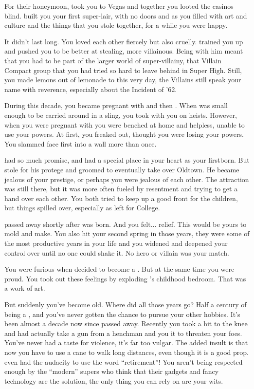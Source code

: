 \documentclass[char]{LRSguildcamp1}
\begin{document}
For their honeymoon, \cGS{\they} took you to Vegas and together you looted the casinos blind. \cGS{\They} built you your first super-lair, with no doors and as you filled with art and culture and the things that you stole together, for a while you were happy. 

It didn't last long. You loved each other fiercely but also cruelly. \cGS{} trained you up and pushed you to be better at stealing, more villainous. Being with him meant that you had to be part of the larger world of super-villainy, that Villain Compact group that you had tried so hard to leave behind in Super High. Still, you made lemons out of lemonade to this very day, the Villains still speak your name with reverence, especially about the Incident of '62. 

During this decade, you became pregnant with \cOldest{} and then \cArchitect{}. When \cOldest{} was small enough to be carried around in a sling, you took \cOldest{\them} with you on heists. However, when you were pregnant with \cArchitect{} you were benched at home and helpless, unable to use your powers.  At first, you freaked out, thought you were losing your powers. You slammed face first into a wall more than once.

\cOldest{} had so much promise, and had a special place in your heart as your firstborn. But \cGS{} stole \cOldest{} for his protege and groomed \cOldest{\them} to eventually take over Oldtown. He became jealous of your prestige, or perhaps you were jealous of each other. The attraction was still there, but it was more often fueled by resentment and trying to get a hand over each other.  You both tried to keep up a good front for the children, but things spilled over, especially as \cOldest{} left for College. 

\cGS{} passed away shortly after \cYoungest{} was born. And you felt... relief. This \cYoungest{\offspring} would be yours to mold and make. You also hit your second spring in those years, they were some of the most productive years in your life and you widened and deepened your control over \pCityGrandma{} until no one could shake it. No hero or villain was your match. 

You were furious when \cYoungest{} decided to become a \cYoungest{\hero}. But at the same time you were proud. You took out these feelings by exploding \cYoungest{}’s childhood bedroom. That was a work of art. 

But suddenly you’ve become old. Where did all those years go? Half a century of being a \cGrandma{\villain}, and you’ve never gotten the chance to pursue your other hobbies. It’s been almost a decade now since \cGS{\they} passed away. Recently you took a hit to the knee and had actually take a gun from a henchman and you it to threaten your foes. You’ve never had a taste for violence, it’s far too vulgar. The added insult is that now you have to use a cane to walk long distances, even though it is a good prop. \cOldest{} even had the audacity to use the word “retirement”! You aren’t being respected enough by the “modern” supers who think that their gadgets and fancy technology are the solution, the only thing you can rely on are your wits. 
\end{document}
